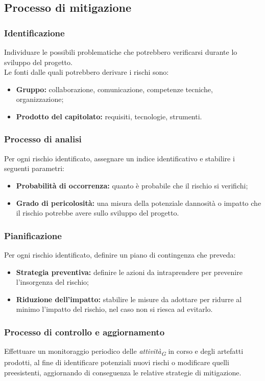 \subsection{Processo di mitigazione}
\subsubsection{Identificazione}
    Individuare le possibili problematiche che potrebbero verificarsi durante lo sviluppo del progetto. \\
    Le fonti dalle quali potrebbero derivare i rischi sono: 
    \begin{itemize}
        \item \textbf{Gruppo:} collaborazione, comunicazione, competenze tecniche, organizzazione;
        \item \textbf{Prodotto del capitolato:} requisiti, tecnologie, strumenti.
    \end{itemize}

\subsubsection{Processo di analisi}
Per ogni rischio identificato, assegnare un indice identificativo e stabilire i seguenti parametri:
\begin{itemize}
    \item \textbf{Probabilità di occorrenza:} quanto è probabile che il rischio si verifichi;
    \item \textbf{Grado di pericolosità:} una misura della potenziale dannosità o impatto che il rischio potrebbe avere sullo sviluppo del progetto.
\end{itemize}

\subsubsection{Pianificazione}
Per ogni rischio identificato, definire un piano di contingenza che preveda:
\begin{itemize}
    \item \textbf{Strategia preventiva:} definire le azioni da intraprendere per prevenire l’insorgenza del rischio;
    \item \textbf{Riduzione dell'impatto:} stabilire le misure da adottare per ridurre al minimo l'impatto del rischio, nel caso non si riesca ad evitarlo.
\end{itemize}

\subsubsection{Processo di controllo e aggiornamento}
Effettuare un monitoraggio periodico delle \textit{attività}\textsubscript{\textit{G}} in corso e degli artefatti prodotti, al fine di identificare potenziali nuovi rischi o modificare quelli preesistenti, aggiornando di conseguenza le relative strategie di mitigazione.

